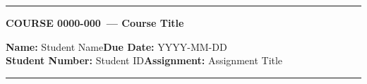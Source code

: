 \documentclass[12pt,letterpaper]{article}
\newcommand{\StudentName}{Student Name}
\newcommand{\StudentID}{Student ID}
\newcommand{\CourseCode}{COURSE 0000-000}
\newcommand{\CourseTitle}{Course Title}
\newcommand{\AssignmentTitle}{Assignment Title}
\newcommand{\DueDate}{YYYY-MM-DD}
\begin{document}
\thispagestyle{firstpage}

\begin{center}
  \hrule
  \vspace{0.4cm}
  {\large\textbf{\CourseCode\ --- \CourseTitle}}
\end{center}
\textbf{Name:} \StudentName\hfill\textbf{Due Date:} \DueDate\\
\textbf{Student Number:} \StudentID\hfill\textbf{Assignment:} \AssignmentTitle\\
\hrule

\vspace{0.8em}

% 

\printbibliography
\end{document}
